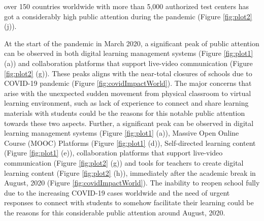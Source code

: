 \documentclass[11pt,a4paper,]{article}
\begin{document}
over 150 countries worldwide with more than 5,000 authorized test centers has got a considerably high public attention during the pandemic (Figure \ref{fig:plot2} (j)).

At the start of the pandemic in March 2020, a significant peak of public attention can be observed in both digital learning management systems (Figure \ref{fig:plot1} (a)) and collaboration platforms that support live-video communication (Figure \ref{fig:plot2} (g)). These peaks aligns with the near-total closures of schools due to COVID-19 pandemic (Figure \ref{fig:covidImpactWorld}). The major concerns that arise with the unexpected sudden movement from physical classroom to virtual learning environment, such as lack of experience to connect and share learning materials with students could be the reasons for this notable public attention towards these two aspects. Further, a significant peak can be observed in digital learning management systems (Figure \ref{fig:plot1} (a)), Massive Open Online Course (MOOC) Platforms (Figure \ref{fig:plot1} (d)), Self-directed learning content (Figure \ref{fig:plot1} (e)), collaboration platforms that support live-video communication (Figure \ref{fig:plot2} (g)) and tools for teachers to create digital learning content (Figure \ref{fig:plot2} (h)), immediately after the academic break in August, 2020 (Figure \ref{fig:covidImpactWorld}). The inability to reopen school fully due to the increasing COVID-19 cases worldwide and the need of urgent responses to connect with students to somehow facilitate their learning could be the reasons for this considerable public attention around August, 2020.
\end{document}
